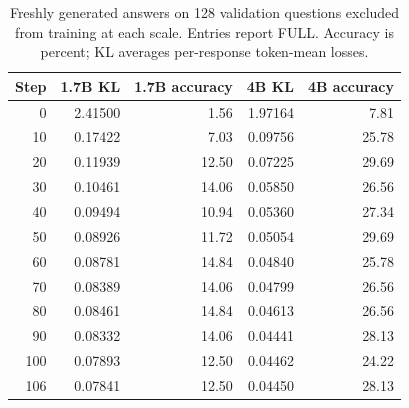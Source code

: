 \begin{table}[!htbp]
\centering
\caption{Freshly generated answers on 128 validation questions excluded from training at each scale. Entries report FULL. Accuracy is percent; KL averages per-response token-mean losses.}
\label{tab:two_scale_validation}
\small
\setlength{\tabcolsep}{3pt}
\begin{tabular}{rrrrr}
\toprule
Step & 1.7B KL & 1.7B accuracy & 4B KL & 4B accuracy \\
\midrule
0 & 2.41500 & 1.56 & 1.97164 & 7.81 \\
10 & 0.17422 & 7.03 & 0.09756 & 25.78 \\
20 & 0.11939 & 12.50 & 0.07225 & 29.69 \\
30 & 0.10461 & 14.06 & 0.05850 & 26.56 \\
40 & 0.09494 & 10.94 & 0.05360 & 27.34 \\
50 & 0.08926 & 11.72 & 0.05054 & 29.69 \\
60 & 0.08781 & 14.84 & 0.04840 & 25.78 \\
70 & 0.08389 & 14.06 & 0.04799 & 26.56 \\
80 & 0.08461 & 14.84 & 0.04613 & 26.56 \\
90 & 0.08332 & 14.06 & 0.04441 & 28.13 \\
100 & 0.07893 & 12.50 & 0.04462 & 24.22 \\
106 & 0.07841 & 12.50 & 0.04450 & 28.13 \\
\bottomrule
\end{tabular}
\end{table}
